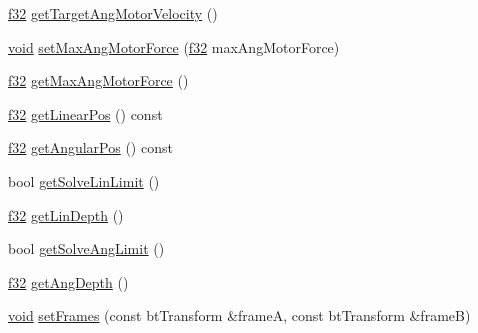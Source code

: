 \begin{DoxyCompactItemize}
\item 
\mbox{\hyperlink{_util_8h_a5f6906312a689f27d70e9d086649d3fd}{f32}} \mbox{\hyperlink{classnjli_1_1_physics_constraint_slider_a9f765345742e2ca1fd00a8bac20bc364}{get\+Target\+Ang\+Motor\+Velocity}} ()
\item 
\mbox{\hyperlink{_thread_8h_af1e856da2e658414cb2456cb6f7ebc66}{void}} \mbox{\hyperlink{classnjli_1_1_physics_constraint_slider_a3bc3e5a8ed7d5d139f826f80baf8a4e5}{set\+Max\+Ang\+Motor\+Force}} (\mbox{\hyperlink{_util_8h_a5f6906312a689f27d70e9d086649d3fd}{f32}} max\+Ang\+Motor\+Force)
\item 
\mbox{\hyperlink{_util_8h_a5f6906312a689f27d70e9d086649d3fd}{f32}} \mbox{\hyperlink{classnjli_1_1_physics_constraint_slider_a3431f4ad0d98ae77b47c94c20afdf46e}{get\+Max\+Ang\+Motor\+Force}} ()
\item 
\mbox{\hyperlink{_util_8h_a5f6906312a689f27d70e9d086649d3fd}{f32}} \mbox{\hyperlink{classnjli_1_1_physics_constraint_slider_a78c6ac55f5986dcfeeb43291019bd94b}{get\+Linear\+Pos}} () const
\item 
\mbox{\hyperlink{_util_8h_a5f6906312a689f27d70e9d086649d3fd}{f32}} \mbox{\hyperlink{classnjli_1_1_physics_constraint_slider_a27e2a17ec40d5a576b67e76e31a4f986}{get\+Angular\+Pos}} () const
\item 
bool \mbox{\hyperlink{classnjli_1_1_physics_constraint_slider_a5a708d3b494cedca05791f188fd8c6e7}{get\+Solve\+Lin\+Limit}} ()
\item 
\mbox{\hyperlink{_util_8h_a5f6906312a689f27d70e9d086649d3fd}{f32}} \mbox{\hyperlink{classnjli_1_1_physics_constraint_slider_a398bd60beef995b8b39e92ea6b7565fa}{get\+Lin\+Depth}} ()
\item 
bool \mbox{\hyperlink{classnjli_1_1_physics_constraint_slider_a9bc2c78196e81aa82a7708c0ec9e0628}{get\+Solve\+Ang\+Limit}} ()
\item 
\mbox{\hyperlink{_util_8h_a5f6906312a689f27d70e9d086649d3fd}{f32}} \mbox{\hyperlink{classnjli_1_1_physics_constraint_slider_a1f98662c2eec6024fb68e54031afabed}{get\+Ang\+Depth}} ()
\item 
\mbox{\hyperlink{_thread_8h_af1e856da2e658414cb2456cb6f7ebc66}{void}} \mbox{\hyperlink{classnjli_1_1_physics_constraint_slider_aa094607cc490eaf1edcf429267d76070}{set\+Frames}} (const bt\+Transform \&frameA, const bt\+Transform \&frameB)
\end{DoxyCompactItemize}
